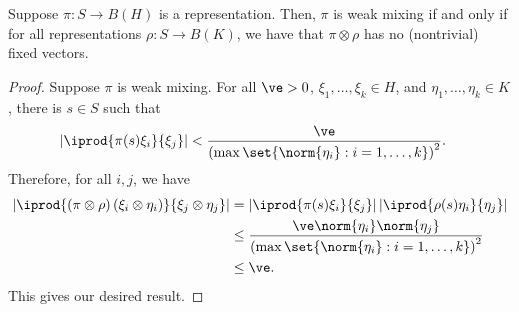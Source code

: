 \documentclass[10pt]{mypackage}
\begin{document}
\begin{proposition}
  Suppose $\pi\colon S\to B\left( H \right)$ is a representation. Then, $\pi$ is weak mixing if and only if for all representations $\rho\colon S\to B\left( K \right)$, we have that $\pi\otimes \rho$ has no (nontrivial) fixed vectors.
\end{proposition}
\begin{proof}
  Suppose $\pi$ is weak mixing. For all $\ve > 0$, $\xi_1,\dots,\xi_k\in H$, and $\eta_1,\dots,\eta_k\in K$, there is $s\in S$ such that
  \begin{align*}
    \left\vert \iprod{\pi(s)\xi_i}{\xi_j} \right\vert & < \frac{\ve}{\left( \max\set{\norm{\eta_i} : i=1,\dots,k} \right)^2}.
  \end{align*}
  Therefore, for all $i,j$, we have
  \begin{align*}
    \left\vert \iprod{\left( \pi\otimes\rho \right)\left( \xi_i\otimes \eta_i \right)}{\xi_j\otimes \eta_j} \right\vert &= \left\vert \iprod{\pi(s)\xi_i}{\xi_j} \right\vert \left\vert \iprod{\rho(s)\eta_i}{\eta_j} \right\vert\\
                                                                                                                              &\leq \frac{\ve\norm{\eta_i}\norm{\eta_j}}{\left( \max\set{\norm{\eta_i} : i=1,\dots,k} \right)^2}\\
                                                                                                                                                                                                                                                                                                  &\leq \ve.
  \end{align*}
  This gives our desired result.


\end{proof}
\end{document}
